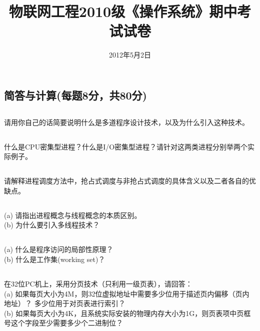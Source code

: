 \documentclass[a4paper,11pt]{article}
\title{物联网工程2010级《操作系统》期中考试试卷}
\date{}
\date{2012年5月2日}
\begin{document}
\begin{CJK*}{UTF8}{gbsn}

\maketitle

\section{简答与计算(每题8分，共80分)}
\subsection{}
请用你自己的话简要说明什么是多道程序设计技术，以及为什么引入这种技术。
\\[1in]

\subsection{}
什么是CPU密集型进程？什么是I/O密集型进程？请针对这两类进程分别举两个实际例子。
\\[1in]

\subsection{}
请解释进程调度方法中，抢占式调度与非抢占式调度的具体含义以及二者各自的优缺点。
\\[1in]

\subsection{}
(a) 请指出进程概念与线程概念的本质区别。\\
(b) 为什么要引入多线程技术？
\\[1in]

\subsection{}
(a)  什么是程序访问的局部性原理？\\
(b)  什么是工作集(working set)？
\\[1in]

\subsection{}
在32位PC机上，采用分页技术（只利用一级页表），请回答： \\%
(a) 如果每页大小为4M，则32位虚拟地址中需要多少位用于描述页内偏移（页内地址）？ 多少位用于对页表进行索引？\\
(b) 如果每页大小为4K，且系统实际安装的物理内存大小为1G，则页表项中页框号这个字段至少需要多少个二进制位？
\\[1in]


\end{CJK*}
\end{document}
